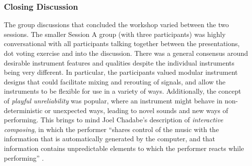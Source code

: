\documentclass[letterpaper, 12pt]{article}
\begin{document}
    

\subsubsection{Closing Discussion}

The group discussions that concluded the workshop varied between the two sessions. The smaller Session A group (with three participants) was highly conversational with all participants talking together between the presentations, dot voting exercise and into the discussion. There was a general consensus around desirable instrument features and qualities despite the individual instruments being very different. In particular, the participants valued modular instrument designs that could facilitate mixing and rerouting of signals, and allow the instruments to be flexible for use in a variety of ways. Additionally, the concept of \emph{playful unreliability} was popular, where an instrument might behave in non-deterministic or unexpected ways, leading to novel sounds and new ways of performing. This brings to mind Joel Chadabe's description of \emph{interactive composing}, in which the performer ``shares control of the music with the information that is automatically generated by the computer, and that information contains unpredictable elements to which the performer reacts while performing'' \citep[p. 23]{Chadabe1984}.
\end{document}
